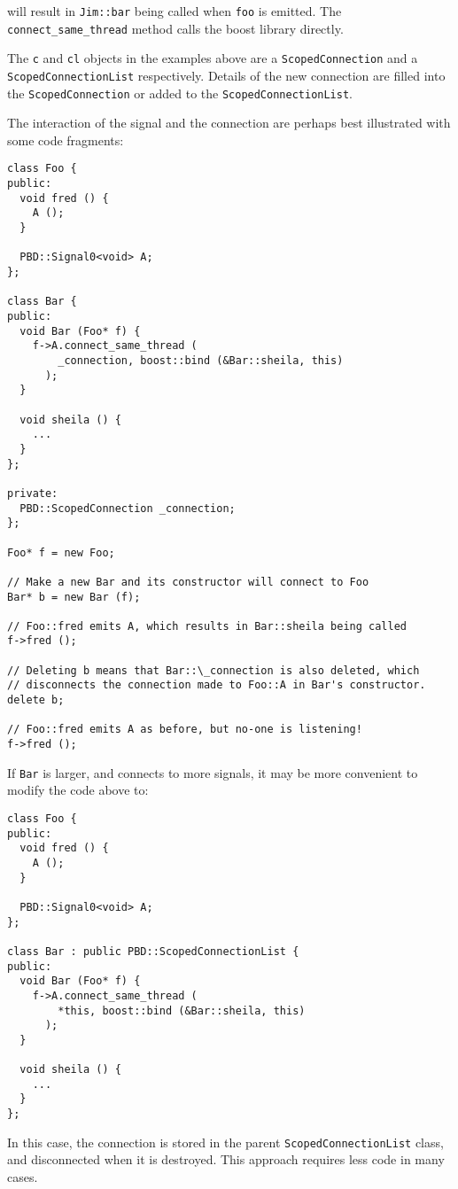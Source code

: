 \documentclass[10pt,a4paper]{book}
\newcommand{\code}[1]{\texttt{#1}}
\begin{document}
will result in \code{Jim::bar} being called when \code{foo} is
emitted.  The \code{connect\_same\_thread} method calls the boost
library directly.

The \code{c} and \code{cl} objects in the
examples above are a \code{ScopedConnection} and a
\code{ScopedConnectionList} respectively.  Details of the new
connection are filled into the \code{ScopedConnection} or added to the
\code{ScopedConnectionList}.

The interaction of the signal and the connection are perhaps best
illustrated with some code fragments:

\begin{lstlisting}
class Foo {
public:
  void fred () {
    A ();
  }

  PBD::Signal0<void> A;
};

class Bar {
public:
  void Bar (Foo* f) {
    f->A.connect_same_thread (
        _connection, boost::bind (&Bar::sheila, this)
      );
  }

  void sheila () {
    ...
  }
};

private:
  PBD::ScopedConnection _connection;
};

Foo* f = new Foo;

// Make a new Bar and its constructor will connect to Foo
Bar* b = new Bar (f);

// Foo::fred emits A, which results in Bar::sheila being called
f->fred ();

// Deleting b means that Bar::\_connection is also deleted, which
// disconnects the connection made to Foo::A in Bar's constructor.
delete b;

// Foo::fred emits A as before, but no-one is listening!
f->fred ();
\end{lstlisting}

If \code{Bar} is larger, and connects to more signals, it may be more
convenient to modify the code above to:

\begin{lstlisting}
class Foo {
public:
  void fred () {
    A ();
  }

  PBD::Signal0<void> A;
};

class Bar : public PBD::ScopedConnectionList {
public:
  void Bar (Foo* f) {
    f->A.connect_same_thread (
        *this, boost::bind (&Bar::sheila, this)
      );
  }

  void sheila () {
    ...
  }
};
\end{lstlisting}

In this case, the connection is stored in the parent
\code{ScopedConnectionList} class, and disconnected when it is
destroyed.  This approach requires less code in many cases.
\end{document}
